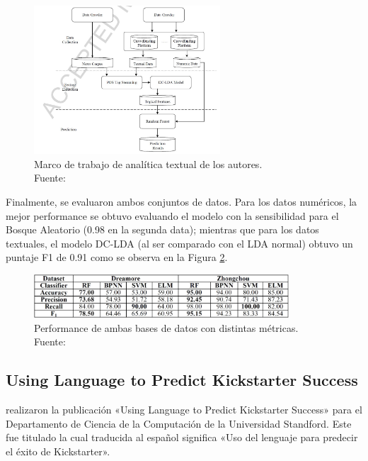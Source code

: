 \begin{figure}[!ht]
	\begin{center}
		\includegraphics[width=0.62\textwidth]{2/figures/yuan2016a.jpg}
		\caption[Marco de trabajo de analítica textual de los autores]{Marco de trabajo de analítica textual de los autores.\\
			Fuente: \cite{pr_yuan2016textanalytics}}
		\label{2:fig117}
	\end{center}
\end{figure}

Finalmente, se evaluaron ambos conjuntos de datos. Para los datos numéricos, la mejor performance se obtuvo evaluando el modelo con la sensibilidad para el Bosque Aleatorio (0.98 en la segunda data); mientras que para los datos textuales, el modelo DC-LDA (al ser comparado con el LDA normal) obtuvo un puntaje F1 de 0.91 como se observa en la Figura \ref{2:fig118}.

\begin{figure}[!ht]
	\begin{center}
		\includegraphics[width=0.85\textwidth]{2/figures/yuan2016b.jpg}
		\caption[Performance de ambas bases de datos con distintas métricas]{Performance de ambas bases de datos con distintas métricas.\\
			Fuente: \cite{pr_yuan2016textanalytics}}
		\label{2:fig118}
	\end{center}
\end{figure}

\subsection{Using Language to Predict Kickstarter Success \citep*{pr_sawhney2016usingLT}}
\citeauthor{pr_sawhney2016usingLT} realizaron la publicación «Using Language to Predict Kickstarter Success» para el Departamento de Ciencia de la Computación de la Universidad Standford. Este fue titulado  la cual traducida al español significa «Uso del lenguaje para predecir el éxito de Kickstarter».

